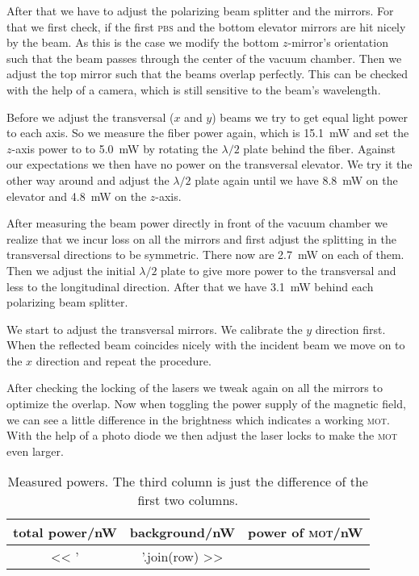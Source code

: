 \documentclass[11pt, english, fleqn, DIV=15, headinclude, BCOR=2cm]{scrreprt}
\newcommand\mot{\textsc{mot}}
\begin{document}
After that we have to adjust the polarizing beam splitter and the mirrors. For
that we first check, if the first \textsc{pbs} and the bottom elevator mirrors
are hit nicely by the beam. As this is the case we modify the bottom
$z$-mirror's orientation such that the beam passes through the center of the
vacuum chamber. Then we adjust the top mirror such that the beams overlap
perfectly. This can be checked with the help of a camera, which is still
sensitive to the beam's wavelength.

Before we adjust the transversal ($x$ and $y$) beams we try to get equal light
power to each axis. So we measure the fiber power again, which is
\SI{15.1}{\milli\watt} and set the $z$-axis power to to \SI{5.0}{\milli\watt}
by rotating the $\lambda/2$ plate behind the fiber. Against our expectations we
then have no power on the transversal elevator. We try it the other way around
and adjust the $\lambda/2$ plate again until we have \SI{8.8}{\milli\watt} on
the elevator and \SI{4.8}{\milli\watt} on the $z$-axis.

After measuring the beam power directly in front of the vacuum chamber we
realize that we incur loss on all the mirrors and first adjust the splitting in
the transversal directions to be symmetric. There now are \SI{2.7}{\milli\watt}
on each of them. Then we adjust the initial $\lambda/2$ plate to give more
power to the transversal and less to the longitudinal direction. After that we
have \SI{3.1}{\milli\watt} behind each polarizing beam splitter.

We start to adjust the transversal mirrors. We calibrate the $y$ direction
first. When the reflected beam coincides nicely with the incident beam we move
on to the $x$ direction and repeat the procedure. 

After checking the locking of the lasers we tweak again on all the mirrors to
optimize the overlap. Now when toggling the power supply of the magnetic field,
we can see a little difference in the brightness which indicates a working
\mot. With the help of a photo diode we then adjust the laser locks to
make the \mot{} even larger.

\begin{table}
    \centering
    \begin{tabular}{SSS}
        \toprule
        {total power/\si{\nano\watt}}
        & {background/\si{\nano\watt}}
        & {power of \mot/\si{\nano\watt}} \\
        \midrule
        << ' & '.join(row) >> \\
        \bottomrule
    \end{tabular}
    \caption{%
        Measured powers. The third column is just the difference of the first
        two columns.
    }
    \label{tab:mot_power}
\end{table}
\end{document}
